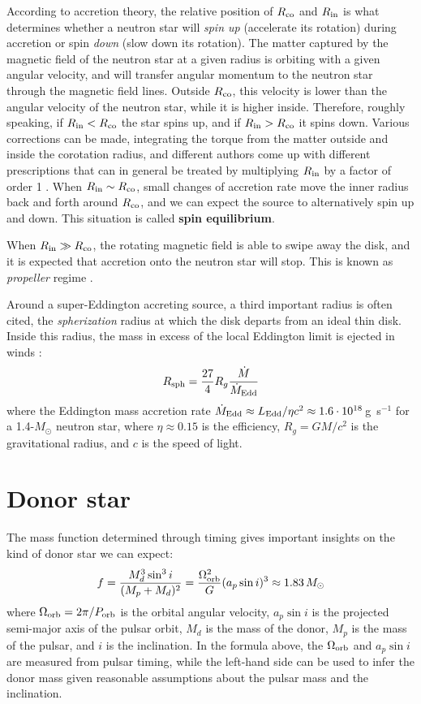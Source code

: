 \documentclass[twocolumn]{aastex631}
\newcommand{\ledd}{\ensuremath{L_{\rm Edd}}}
\newcommand{\Mdot}{\ensuremath{\dot{M}}}
\newcommand{\rin}{\ensuremath{R_{\rm in}}}
\newcommand{\rco}{\ensuremath{R_{\rm co}}}
\newcommand{\rsph}{\ensuremath{R_{\rm sph}}}
\newcommand{\msun}{\ensuremath{M_{\odot}}\xspace}
\begin{document}
According to accretion theory, the relative position of $\rco$ and $\rin$ is what determines whether a neutron star will \textit{spin up} (accelerate its rotation) during accretion or spin \textit{down} (slow down its rotation).
The matter captured by the magnetic field of the neutron star at a given radius is orbiting with a given angular velocity, and will transfer angular momentum to the neutron star through the magnetic field lines.
Outside $\rco$, this velocity is lower than the angular velocity of the neutron star, while it is higher inside.
Therefore, roughly speaking, if $\rin<\rco$ the star spins up, and if $\rin>\rco$ it spins down.
Various corrections can be made, integrating the torque from the matter outside and inside the corotation radius, and different authors come up with different prescriptions that can in general be treated by multiplying $\rin$ by a factor of order 1 \citep{ghoshDiskAccretionMagnetic1978,wangLocationInnerRadius1996}.
When $\rin\sim\rco$, small changes of accretion rate move the inner radius back and forth around $\rco$, and we can expect the source to alternatively spin up and down.
This situation is called \textbf{spin equilibrium}.

When $\rin\gg\rco$, the rotating magnetic field is able to swipe away the disk, and it is expected that accretion onto the neutron star will stop.
This is known as \textit{propeller} regime \citep{illarionovWhyNumberGalactic1975}.

Around a super-Eddington accreting source, a third important radius is often cited, the \textit{spherization} radius at which the disk departs from an ideal thin disk. Inside this radius, the mass in excess of the local Eddington limit is ejected in winds \citep{shakuraBlackHolesBinary1973}:
\begin{equation}
    \rsph = \frac{27}{4}R_g \frac{\Mdot}{\Mdot_{\rm Edd}}
\end{equation}
where the Eddington mass accretion rate $\Mdot_{\rm Edd}\approx \ledd/\eta c^2\approx 1.6\cdot10^{18}$\,g~s$^{-1}$ for a 1.4-$\msun$ neutron star, where $\eta\approx0.15$ is the efficiency, $R_g=GM/c^2$ is the gravitational radius, and $c$ is the speed of light.

\section{Donor star}\label{sec:donor}

The mass function determined through timing gives important insights on the kind of donor star we can expect:
\begin{equation}
    f = \frac{M^3_d \sin^3 i}{(M_p + M_d)^2} = \frac{\Omega^2_{\rm orb}}{G} (a_p\sin i)^3\approx1.83\,\msun
\end{equation}
where $\Omega_{\rm orb}=2\pi/P_{\rm orb}$ is the orbital angular velocity, $a_p\sin i$ is the projected semi-major axis of the pulsar orbit, $M_d$ is the mass of the donor, $M_p$ is the mass of the pulsar, and $i$ is the inclination.
In the formula above, the $\Omega_{\rm orb}$ and $a_p \sin i$ are measured from pulsar timing, while the left-hand side can be used to infer the donor mass given reasonable assumptions about the pulsar mass and the inclination.
\end{document}
